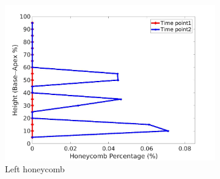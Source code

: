 \begin{figure}[H]
\begin{subfigure}{.42\linewidth}
  \includegraphics[width=\linewidth,trim={{.0\wd0} {.0\wd0} {.0\wd0} {.0\wd0}},clip]{Appendix/Image_AppexA/BaseToApex/IPF14LeftLungHoneycombDiseaseAgainstHeight.jpg} %
  \caption{Left honeycomb}
  \label{fig:IPF14DiseaseAgainstHeight-e} 
\end{subfigure} 
\begin{subfigure}{.42\linewidth}%

\end{subfigure}
\end{figure}
